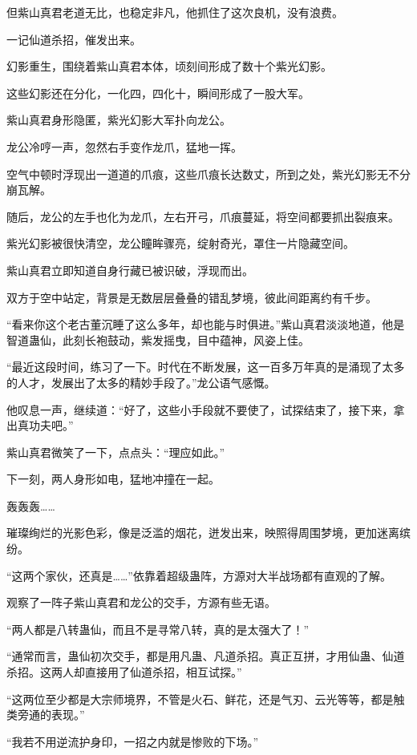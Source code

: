 \begin{this_body}
但紫山真君老道无比，也稳定非凡，他抓住了这次良机，没有浪费。

一记仙道杀招，催发出来。

幻影重生，围绕着紫山真君本体，顷刻间形成了数十个紫光幻影。

这些幻影还在分化，一化四，四化十，瞬间形成了一股大军。

紫山真君身形隐匿，紫光幻影大军扑向龙公。

龙公冷哼一声，忽然右手变作龙爪，猛地一挥。

空气中顿时浮现出一道道的爪痕，这些爪痕长达数丈，所到之处，紫光幻影无不分崩瓦解。

随后，龙公的左手也化为龙爪，左右开弓，爪痕蔓延，将空间都要抓出裂痕来。

紫光幻影被很快清空，龙公瞳眸骤亮，绽射奇光，罩住一片隐藏空间。

紫山真君立即知道自身行藏已被识破，浮现而出。

双方于空中站定，背景是无数层层叠叠的错乱梦境，彼此间距离约有千步。

“看来你这个老古董沉睡了这么多年，却也能与时俱进。”紫山真君淡淡地道，他是智道蛊仙，此刻长袍鼓动，紫发摇曳，目中蕴神，风姿上佳。

“最近这段时间，练习了一下。时代在不断发展，这一百多万年真的是涌现了太多的人才，发展出了太多的精妙手段了。”龙公语气感慨。

他叹息一声，继续道：“好了，这些小手段就不要使了，试探结束了，接下来，拿出真功夫吧。”

紫山真君微笑了一下，点点头：“理应如此。”

下一刻，两人身形如电，猛地冲撞在一起。

轰轰轰……

璀璨绚烂的光影色彩，像是泛滥的烟花，迸发出来，映照得周围梦境，更加迷离缤纷。

“这两个家伙，还真是……”依靠着超级蛊阵，方源对大半战场都有直观的了解。

观察了一阵子紫山真君和龙公的交手，方源有些无语。

“两人都是八转蛊仙，而且不是寻常八转，真的是太强大了！”

“通常而言，蛊仙初次交手，都是用凡蛊、凡道杀招。真正互拼，才用仙蛊、仙道杀招。这两人却直接用了仙道杀招，相互试探。”

“这两位至少都是大宗师境界，不管是火石、鲜花，还是气刃、云光等等，都是触类旁通的表现。”

“我若不用逆流护身印，一招之内就是惨败的下场。”


\end{this_body}
